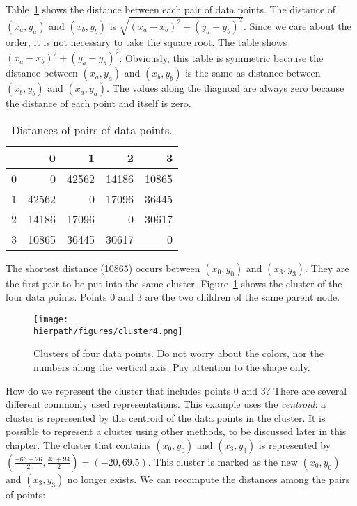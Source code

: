 Table~\ref{table:hierarchical:distance4points} shows the distance
between each pair of data points.  The distance of $(x_a, y_a)$ and
$(x_b, y_b)$ is $\sqrt{(x_a - x_b)^2 + (y_a - y_b)^2}$. Since we care
about the order, it is not necessary to take the square root.
The
table shows ${(x_a - x_b)^2 + (y_a - y_b)^2}$:
Obviously, this table is symmetric because the distance between $(x_a,
y_a)$ and $(x_b, y_b)$ is the same as distance between $(x_b, y_b)$
and $(x_a, y_a)$. The values along the diagnoal are always zero
because the distance of each point and itself is zero.

\begin{table}
  \begin{tt}
\begin{tabular}{|r|rrrr|}  \hline
& 0 & 1 & 2 & 3  \\ \hline

0 & 0& 42562& 14186& 10865\\
1 & 42562& 0& 17096& 36445\\
2 & 14186& 17096& 0& 30617\\
3 & 10865& 36445& 30617& 0\\ \hline
\end{tabular}
  \end{tt}
  \caption{Distances of pairs of data points.}
  \label{table:hierarchical:distance4points}
\end{table}

The shortest distance (10865) occurs between $(x_0, y_0)$ and $(x_3,
y_3)$.  They are the first pair to be put into the same cluster.
Figure~\ref{fig:hierarchical:cluster4} shows 
the cluster of the four data points. Points 0 and 3 are the two
children of the same parent node. 

\begin{figure}[h] \centering
{\texttt{[image: \\hierpath/figures/cluster4.png]}}
\caption{Clusters of four data points.
Do not worry about the colors, nor the numbers along the vertical
axis. Pay attention to the shape only.
}
\label{fig:hierarchical:cluster4}
\end{figure}

How do we represent the cluster that includes points 0 and 3?  There
are several different commonly used representations.  This example
uses the {\it centroid}: a cluster is represented by the centroid of
the data points in the cluster. It is possible to represent a cluster
using other methods, to be discussed later in this chapter.  The
cluster that contains $(x_0, y_0)$ and $(x_3, y_3)$ is represented by
$(\frac{-66+26}{2}, \frac{45+94}{2}) = (-20, 69.5)$.  This cluster is
marked as the new $(x_0, y_0)$ and $(x_3, y_3)$ no longer exists.  We
can recompute the distances among the pairs of points:


